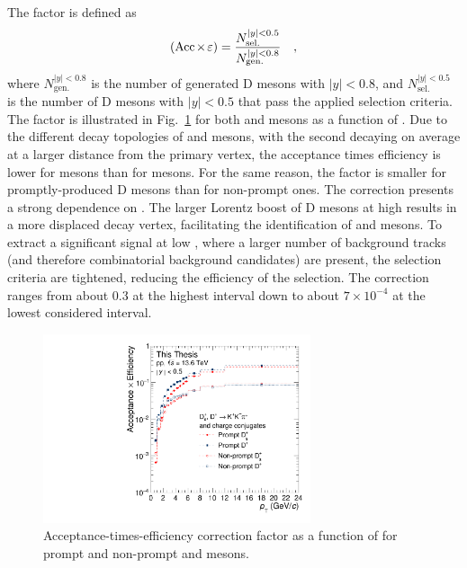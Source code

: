 The \aeff factor is defined as
\begin{equation*}
    (\mathrm{Acc}\mkern-2mu\times\mkern-2mu\varepsilon) = \frac{N_\mathrm{sel.}^{\lvert y\rvert<0.5}}{N_\mathrm{gen.}^{\lvert y\rvert<0.8}}\quad ,
\end{equation*}
where $N_\mathrm{gen.}^{\lvert y\rvert<0.8}$ is the number of generated D mesons with $\lvert y\rvert<0.8$, and $N_\mathrm{sel.}^{\lvert y\rvert<0.5}$ is the number of D mesons with $\lvert y\rvert<0.5$ that pass the applied selection criteria. The \aeff factor is illustrated in Fig.~\ref{fig:Aeff} for both \ds and \dpl mesons as a function of \pt. Due to the different decay topologies of \ds and \dpl mesons, with the second decaying on average at a larger distance from the primary vertex, the acceptance times efficiency is lower for \ds mesons than for \dpl mesons. For the same reason, the \aeff factor is smaller for promptly-produced D mesons than for non-prompt ones. The correction presents a strong dependence on \pt. The larger Lorentz boost of D mesons at high \pt results in a more displaced decay vertex, facilitating the identification of \ds and \dpl mesons. To extract a significant signal at low \pt, where a larger number of background tracks (and therefore combinatorial background candidates) are present, the selection criteria are tightened, reducing the efficiency of the selection. The \aeff correction ranges from about 0.3 at the highest \pt interval down to about $7\times 10^{-4}$ at the lowest considered \pt interval.


\begin{figure}[htb]
    \begin{center}
    \includegraphics[width=0.7\textwidth]{Figures/Chapter 6/Efficiency_LHC24d3a.pdf}
    \caption{Acceptance-times-efficiency correction factor as a function of \pt for prompt and non-prompt \ds and \dpl mesons.} 
    \label{fig:Aeff} 
    \end{center}
\end{figure}

